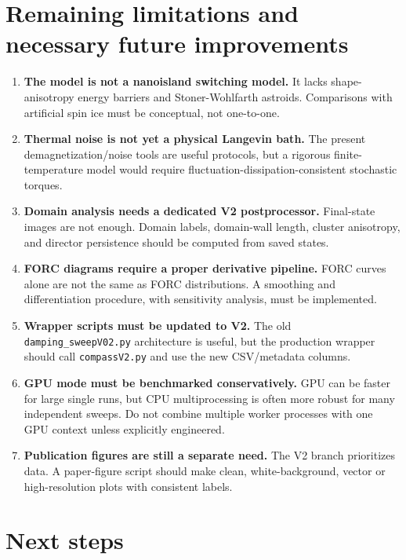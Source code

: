 \documentclass[11pt,a4paper]{article}
\newcommand{\code}[1]{\texttt{#1}}
\begin{document}
\section{Remaining limitations and necessary future improvements}
\label{sec:limitations}

\begin{enumerate}[leftmargin=*]
\item \textbf{The model is not a nanoisland switching model.} It lacks shape-anisotropy energy barriers and Stoner-Wohlfarth astroids. Comparisons with artificial spin ice must be conceptual, not one-to-one.
\item \textbf{Thermal noise is not yet a physical Langevin bath.} The present demagnetization/noise tools are useful protocols, but a rigorous finite-temperature model would require fluctuation-dissipation-consistent stochastic torques.
\item \textbf{Domain analysis needs a dedicated V2 postprocessor.} Final-state images are not enough. Domain labels, domain-wall length, cluster anisotropy, and director persistence should be computed from saved states.
\item \textbf{FORC diagrams require a proper derivative pipeline.} FORC curves alone are not the same as FORC distributions. A smoothing and differentiation procedure, with sensitivity analysis, must be implemented.
\item \textbf{Wrapper scripts must be updated to V2.} The old \code{damping\_sweepV02.py} architecture is useful, but the production wrapper should call \code{compassV2.py} and use the new CSV/metadata columns.
\item \textbf{GPU mode must be benchmarked conservatively.} GPU can be faster for large single runs, but CPU multiprocessing is often more robust for many independent sweeps. Do not combine multiple worker processes with one GPU context unless explicitly engineered.
\item \textbf{Publication figures are still a separate need.} The V2 branch prioritizes data. A paper-figure script should make clean, white-background, vector or high-resolution plots with consistent labels.
\end{enumerate}

\section{Next steps}
\label{sec:next}
\end{document}
